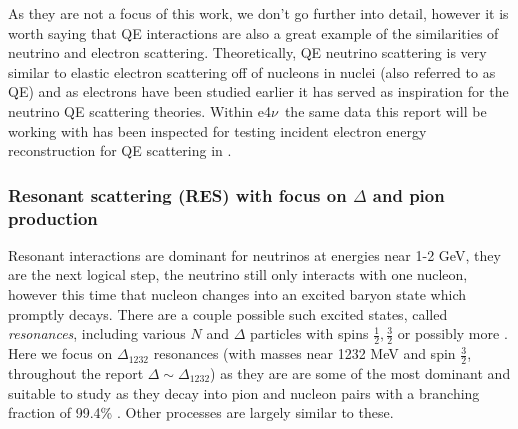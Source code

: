 \documentclass[a4paper,12pt]{article}
\newcommand{\efn}{e4$\nu$}
\begin{document}
As they are not a focus of this work, we don't go further into detail, however it is worth saying that QE interactions are also a great example of the similarities of neutrino and electron scattering.
Theoretically, QE neutrino scattering is very similar to elastic electron scattering off of nucleons in nuclei (also referred to as QE) and as electrons have been studied earlier it has served as inspiration for the neutrino QE scattering theories.
Within \efn\ the same data this report will be working with has been inspected for testing incident electron energy reconstruction for QE scattering in \cite{khachatryanElectronbeamEnergyReconstruction2021}.

\subsubsection{Resonant scattering (RES) with focus on $\Delta$ and pion production}
Resonant interactions are dominant for neutrinos at energies near 1-2 \si{GeV}, they are the next logical step, the neutrino still only interacts with one nucleon, however this time that nucleon changes into an excited baryon state which promptly decays.
There are a couple possible such excited states, called \emph{resonances}, including various $N$ and $\Delta$ particles with spins $\frac{1}{2}, \frac{3}{2}$ or possibly more \cite{leitnerElectronNeutrinonucleusScattering2009}.
Here we focus on $\Delta_{1232}$ resonances (with masses near 1232 \si{MeV} and spin $\frac{3}{2}$, throughout the report $\Delta \sim \Delta_{1232}$) as they are are some of the most dominant and suitable to study as they decay into pion and nucleon pairs with a branching fraction of 99.4\% \cite{particledatagroupReviewParticlePhysics2022}.
Other processes are largely similar to these.
\end{document}
